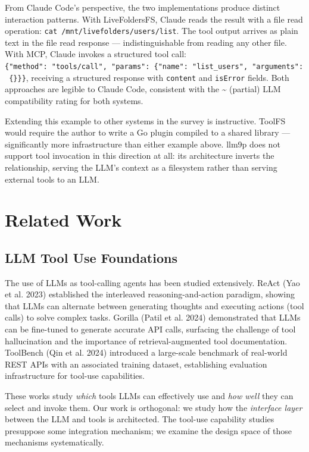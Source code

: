 \documentclass[
  11pt,
]{article}
\begin{document}
From Claude Code's perspective, the two implementations produce distinct
interaction patterns. With LiveFoldersFS, Claude reads the result with a
file read operation: \texttt{cat\ /mnt/livefolders/users/list}. The tool
output arrives as plain text in the file read response ---
indistinguishable from reading any other file. With MCP, Claude invokes
a structured tool call:
\texttt{\{"method":\ "tools/call",\ "params":\ \{"name":\ "list\_users",\ "arguments":\ \{\}\}\}},
receiving a structured response with \texttt{content} and
\texttt{isError} fields. Both approaches are legible to Claude Code,
consistent with the \textasciitilde{} (partial) LLM compatibility rating
for both systems.

Extending this example to other systems in the survey is instructive.
ToolFS would require the author to write a Go plugin compiled to a
shared library --- significantly more infrastructure than either example
above. llm9p does not support tool invocation in this direction at all:
its architecture inverts the relationship, serving the LLM's context as
a filesystem rather than serving external tools to an LLM.

\hypertarget{related-work}{%
\section{Related Work}\label{related-work}}

\hypertarget{llm-tool-use-foundations}{%
\subsection{LLM Tool Use Foundations}\label{llm-tool-use-foundations}}

The use of LLMs as tool-calling agents has been studied extensively.
ReAct (Yao et al. 2023) established the interleaved reasoning-and-action
paradigm, showing that LLMs can alternate between generating thoughts
and executing actions (tool calls) to solve complex tasks. Gorilla
(Patil et al. 2024) demonstrated that LLMs can be fine-tuned to generate
accurate API calls, surfacing the challenge of tool hallucination and
the importance of retrieval-augmented tool documentation. ToolBench (Qin
et al. 2024) introduced a large-scale benchmark of real-world REST APIs
with an associated training dataset, establishing evaluation
infrastructure for tool-use capabilities.

These works study \emph{which} tools LLMs can effectively use and
\emph{how well} they can select and invoke them. Our work is orthogonal:
we study how the \emph{interface layer} between the LLM and tools is
architected. The tool-use capability studies presuppose some integration
mechanism; we examine the design space of those mechanisms
systematically.
\end{document}
